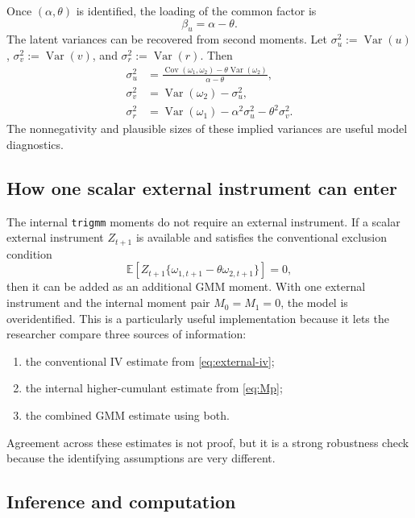 \documentclass[11pt]{article}
\newcommand{\E}{\mathbb{E}}
\newcommand{\Cov}{\operatorname{Cov}}
\newcommand{\Var}{\operatorname{Var}}
\theoremstyle{plain}
\theoremstyle{definition}
\theoremstyle{remark}
\begin{document}
Once $(\alpha,\theta)$ is identified, the loading of the common factor is
\begin{equation}
\beta_u=\alpha-\theta.
\label{eq:beta-u}
\end{equation}
The latent variances can be recovered from second moments. Let
$\sigma_u^2:=\Var(u)$, $\sigma_v^2:=\Var(v)$, and $\sigma_r^2:=\Var(r)$. Then
\begin{align}
\sigma_u^2 &=
\frac{\Cov(\omega_1,\omega_2)-\theta\Var(\omega_2)}{\alpha-\theta},
\label{eq:varu}\\
\sigma_v^2 &= \Var(\omega_2)-\sigma_u^2,
\label{eq:varv}\\
\sigma_r^2 &= \Var(\omega_1)-\alpha^2\sigma_u^2-\theta^2\sigma_v^2.
\label{eq:varr}
\end{align}
The nonnegativity and plausible sizes of these implied variances are useful
model diagnostics.

\subsection{How one scalar external instrument can enter}

The internal \texttt{trigmm} moments do not require an external instrument. If a
scalar external instrument $Z_{t+1}$ is available and satisfies the conventional
exclusion condition
\begin{equation}
\E\left[Z_{t+1}\{\omega_{1,t+1}-\theta \omega_{2,t+1}\}\right]=0,
\label{eq:external-iv}
\end{equation}
then it can be added as an additional GMM moment. With one external instrument
and the internal moment pair $M_0=M_1=0$, the model is overidentified. This is a
particularly useful implementation because it lets the researcher compare three
sources of information:
\begin{enumerate}
\item the conventional IV estimate from \eqref{eq:external-iv};
\item the internal higher-cumulant estimate from \eqref{eq:Mp};
\item the combined GMM estimate using both.
\end{enumerate}
Agreement across these estimates is not proof, but it is a strong robustness
check because the identifying assumptions are very different.

\subsection{Inference and computation}
\end{document}
